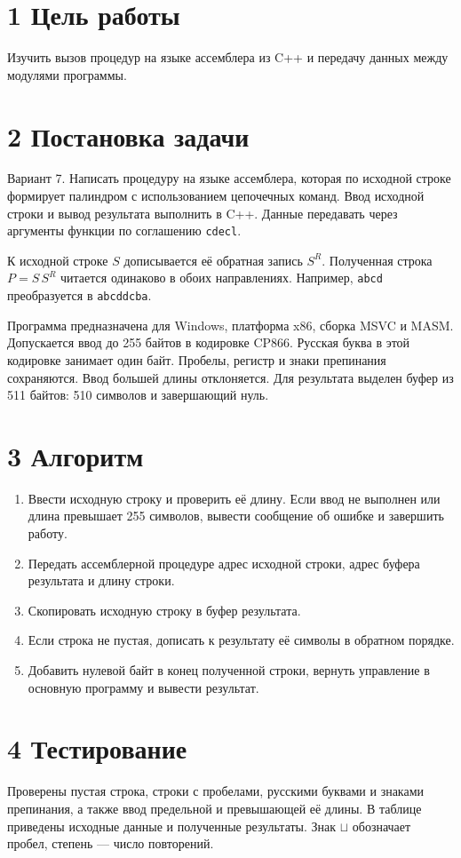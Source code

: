 \documentclass[12pt,a4paper]{article}
\begin{document}
\section*{1 Цель работы}
Изучить вызов процедур на языке ассемблера из C++ и передачу данных
между модулями программы.

\section*{2 Постановка задачи}
Вариант 7. Написать процедуру на языке ассемблера, которая по исходной
строке формирует палиндром с использованием цепочечных команд.
Ввод исходной строки и вывод результата выполнить в C++.
Данные передавать через аргументы функции по соглашению \texttt{cdecl}.

К исходной строке $S$ дописывается её обратная запись $S^R$.
Полученная строка $P=S\,S^R$ читается одинаково в обоих направлениях.
Например, \texttt{abcd} преобразуется в \texttt{abcddcba}.

Программа предназначена для Windows, платформа x86, сборка MSVC и MASM.
Допускается ввод до 255 байтов в кодировке CP866. Русская буква в этой
кодировке занимает один байт. Пробелы, регистр и знаки препинания сохраняются.
Ввод большей длины отклоняется. Для результата выделен буфер из 511 байтов:
510 символов и завершающий нуль.

\section*{3 Алгоритм}
\begin{enumerate}
\item Ввести исходную строку и проверить её длину. Если ввод не выполнен
или длина превышает 255 символов, вывести сообщение об ошибке и завершить работу.
\item Передать ассемблерной процедуре адрес исходной строки, адрес буфера
результата и длину строки.
\item Скопировать исходную строку в буфер результата.
\item Если строка не пустая, дописать к результату её символы
в обратном порядке.
\item Добавить нулевой байт в конец полученной строки, вернуть управление
в основную программу и вывести результат.
\end{enumerate}

\newpage
\section*{4 Тестирование}
Проверены пустая строка, строки с пробелами, русскими буквами и знаками
препинания, а также ввод предельной и превышающей её длины.
В таблице приведены исходные данные и полученные результаты.
Знак $\mathord{\sqcup}$ обозначает пробел, степень --- число повторений.
\end{document}
